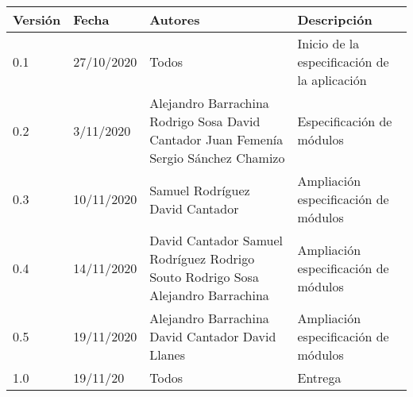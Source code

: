 \documentclass[12pt]{article}
\begin{document}
\noindent\begin{tabularx}{\textwidth}{ |l|l|p{5cm}|X| }
    \hline
    \textbf{Versión} & \textbf{Fecha} & \textbf{Autores}                                                                                                         & \textbf{Descripción}                         \\
    \hline
    0.1              & 27/10/2020     & Todos                                                                                                                    & Inicio de la especificación de la aplicación \\
    \hline
    0.2              & 3/11/2020      & Alejandro Barrachina \newline Rodrigo Sosa \newline David Cantador \newline Juan Femenía \newline Sergio Sánchez Chamizo & Especificación de módulos                    \\
    \hline
    0.3              & 10/11/2020     & Samuel Rodríguez \newline David Cantador                                                                                 & Ampliación especificación de módulos         \\
    \hline
    0.4              & 14/11/2020     & David Cantador \newline Samuel Rodríguez \newline Rodrigo Souto \newline Rodrigo Sosa \newline Alejandro Barrachina      & Ampliación especificación de módulos         \\
    \hline
    0.5              & 19/11/2020     & Alejandro Barrachina \newline David Cantador \newline David Llanes                                                       & Ampliación especificación de módulos         \\
    \hline
    1.0              & 19/11/20       & Todos                                                                                                                    & Entrega                                      \\
    \hline
\end{tabularx}

\newpage
\tableofcontents
\newpage


\newpage

\newpage

\end{document}
